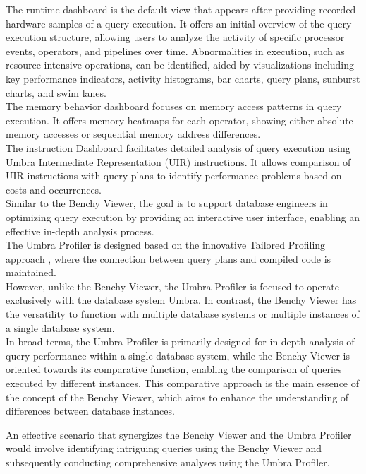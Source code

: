 The runtime dashboard is the default view that appears after providing recorded hardware samples of a query execution. It offers an initial overview of the query execution structure, allowing users to analyze the activity of specific processor events, operators, and pipelines over time. Abnormalities in execution, such as resource-intensive operations, can be identified, aided by visualizations including key performance indicators, activity histograms, bar charts, query plans, sunburst charts, and swim lanes.
\\The memory behavior dashboard focuses on memory access patterns in query execution. It offers memory heatmaps for each operator, showing either absolute memory accesses or sequential memory address differences.
\\The instruction Dashboard facilitates detailed analysis of query execution using Umbra Intermediate Representation (UIR) \parencite*{Kersten2021TidyTA} instructions. It allows comparison of UIR instructions with query plans to identify performance problems based on costs and occurrences. 
\\Similar to the Benchy Viewer, the goal is to support database engineers in optimizing query execution by providing an interactive user interface, enabling an effective in-depth analysis process. 
\\The Umbra Profiler is designed based on the innovative Tailored Profiling approach \cite{profiling-dataflow}, where the connection between query plans and compiled code is maintained.
\\However, unlike the Benchy Viewer, the Umbra Profiler is focused to operate exclusively with the database system Umbra. In contrast, the Benchy Viewer has the versatility to function with multiple database systems or multiple instances of a single database system.
\\In broad terms, the Umbra Profiler is primarily designed for in-depth analysis of query performance within a single database system, while the Benchy Viewer is oriented towards its comparative function, enabling the comparison of queries executed by different instances. This comparative approach is the main essence  of the concept of the Benchy Viewer, which aims to enhance the understanding of differences between database instances.

An effective scenario that synergizes the Benchy Viewer and the Umbra Profiler would involve identifying intriguing queries using the Benchy Viewer and subsequently conducting comprehensive analyses using the Umbra Profiler.



